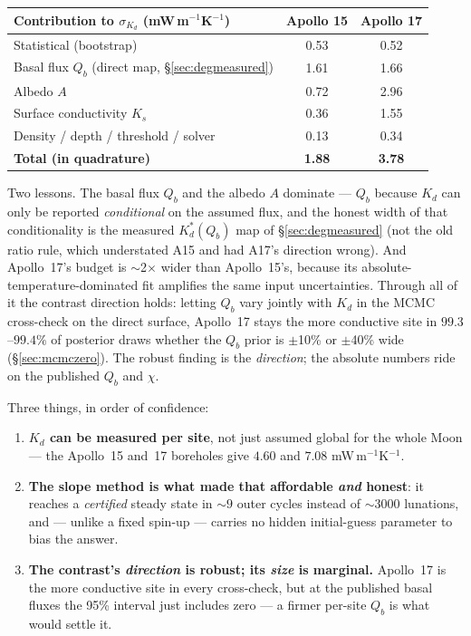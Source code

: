 \documentclass[11pt]{report}
\begin{document}
\begin{center}\small
\begin{tabular}{@{}lcc@{}}
\toprule
Contribution to $\sigma_{K_d}$ (mW\,m$^{-1}$K$^{-1}$) & Apollo 15 & Apollo 17 \\
\midrule
Statistical (bootstrap)        & 0.53 & 0.52 \\
Basal flux $Q_b$ (direct map, \S\ref{sec:degmeasured}) & 1.61 & 1.66 \\
Albedo $A$                     & 0.72 & 2.96 \\
Surface conductivity $K_s$     & 0.36 & 1.55 \\
Density / depth / threshold / solver & 0.13 & 0.34 \\
\midrule
\textbf{Total (in quadrature)} & \textbf{1.88} & \textbf{3.78} \\
\bottomrule
\end{tabular}
\end{center}

\noindent Two lessons. The basal flux $Q_b$ and the albedo $A$ dominate ---
$Q_b$ because $K_d$ can only be reported \emph{conditional} on the assumed
flux, and the honest width of that conditionality is the measured
$K_d^{*}(Q_b)$ map of \S\ref{sec:degmeasured} (not the old ratio rule,
which understated A15 and had A17's direction wrong). And Apollo~17's
budget is $\sim$2$\times$ wider than Apollo~15's, because its
absolute-temperature-dominated fit amplifies the same input
uncertainties. Through all of it the contrast direction holds: letting
$Q_b$ vary jointly with $K_d$ in the MCMC cross-check on the direct
surface, Apollo~17 stays the more conductive site in $99.3$--$99.4\%$ of
posterior draws whether the $Q_b$ prior is $\pm$10\% or $\pm$40\% wide
(\S\ref{sec:mcmczero}). The robust finding is the \emph{direction}; the
absolute numbers ride on the published $Q_b$ and $\chi$.

\begin{keypt}[title={What to take away}]
Three things, in order of confidence:
\begin{enumerate}[leftmargin=1.5em,itemsep=1pt]
\item \textbf{$K_d$ can be measured per site}, not just assumed global for the
  whole Moon --- the Apollo~15 and~17 boreholes give $4.60$ and $7.08$
  mW\,m$^{-1}$K$^{-1}$.
\item \textbf{The slope method is what made that affordable \emph{and} honest}:
  it reaches a \emph{certified} steady state in ${\sim}9$ outer cycles instead of
  ${\sim}3000$ lunations, and --- unlike a fixed spin-up --- carries no hidden
  initial-guess parameter to bias the answer.
\item \textbf{The contrast's \emph{direction} is robust; its \emph{size} is
  marginal.} Apollo~17 is the more conductive site in every cross-check, but at
  the published basal fluxes the 95\% interval just includes zero --- a firmer
  per-site $Q_b$ is what would settle it.
\end{enumerate}
\end{keypt}
\end{document}
